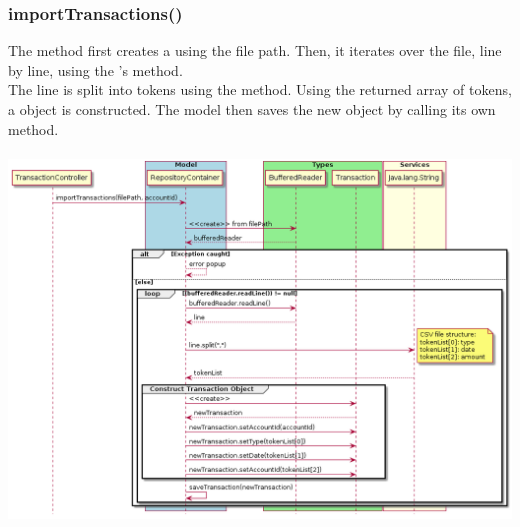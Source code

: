 \documentclass[12pt]{article}
\begin{document}
\newpage
\subsubsection{importTransactions()} \label{sec:modelImportDetail}
The  method first creates a  using the file path. Then, it iterates over the file, line by line, using the 's  method. \\

The line is split into tokens using the  method. Using the returned array of tokens, a  object is constructed. The model then saves the new object by calling its own  method.\\
\\
\includegraphics[width=\textwidth,height=\textheight,keepaspectratio]{diagrams/sequence/importLowLevel.png}
\bigskip
\end{document}
